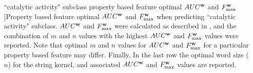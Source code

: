 \begin{table}[h]
\centering

%			
%			
					
	


\caption[``catalytic activity" subclass property based feature optimal  $AUC^{\bf{w}}$ and $F^{\bf{w}}_{\max}$]{Property based feature optimal  $AUC^{\bf{w}}$ and $F^{\bf{w}}_{\max}$ when predicting ``catalytic activity" subclass.  $AUC^{\bf{w}}$ and $F^{\bf{w}}_{\max}$ were calculated as described in , and the combination of $m$ and $n$ values with the highest  $AUC^{\bf{w}}$ and $F^{\bf{w}}_{\max}$ values were reported. Note that optimal $m$ and $n$ values for $AUC^{\bf{w}}$ and $F^{\bf{w}}_{\max}$ for a particular property based feature may differ.  Finally, In the last row the optimal word size ($n$) for the string kernel, and associated $AUC^{\bf{w}}$ and $F^{\bf{w}}_{\max}$ values are reported. }
\label{tab:vqgostandardperformance}
\end{table}

